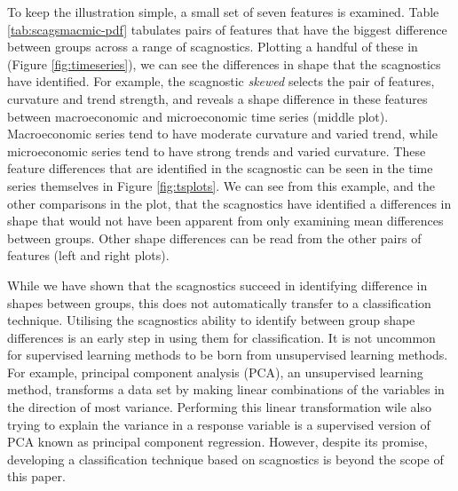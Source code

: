 To keep the illustration simple, a small set of seven features is examined. Table \ref{tab:scagsmacmic-pdf} tabulates pairs of features that have the biggest difference between groups across a range of scagnostics. Plotting a handful of these in (Figure \ref{fig:timeseries}), we can see the differences in shape that the scagnostics have identified. For example, the scagnostic \emph{skewed} selects the pair of features, curvature and trend strength, and reveals a shape difference in these features between macroeconomic and microeconomic time series (middle plot). Macroeconomic series tend to have moderate curvature and varied trend, while microeconomic series tend to have strong trends and varied curvature. These feature differences that are identified in the scagnostic can be seen in the time series themselves in Figure \ref{fig:tsplots}. We can see from this example, and the other comparisons in the plot, that the scagnostics have identified a differences in shape that would not have been apparent from only examining mean differences between groups. Other shape differences can be read from the other pairs of features (left and right plots).

While we have shown that the scagnostics succeed in identifying difference in shapes between groups, this does not automatically transfer to a classification technique. Utilising the scagnostics ability to identify between group shape differences is an early step in using them for classification. It is not uncommon for supervised learning methods to be born from unsupervised learning methods. For example, principal component analysis (PCA), an unsupervised learning method, transforms a data set by making linear combinations of the variables in the direction of most variance. Performing this linear transformation wile also trying to explain the variance in a response variable is a supervised version of PCA known as principal component regression. However, despite its promise, developing a classification technique based on scagnostics is beyond the scope of this paper.

